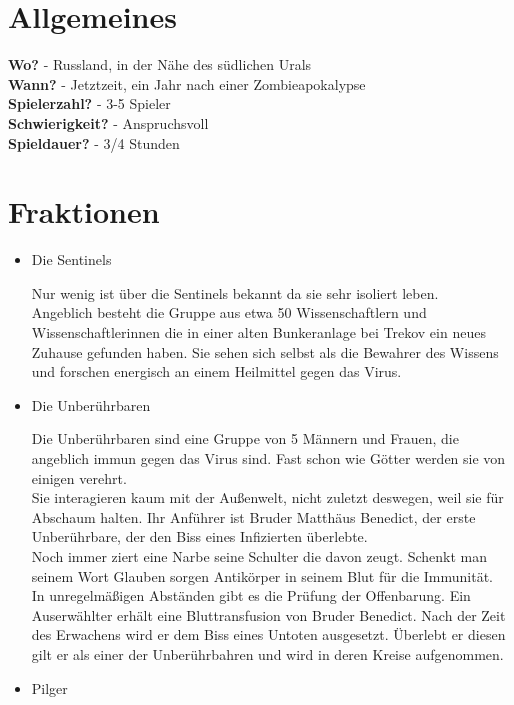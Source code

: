 
\section{Allgemeines}
\textbf{Wo?}            - Russland, in der Nähe des südlichen Urals \\
\textbf{Wann?}          - Jetztzeit, ein Jahr nach einer Zombieapokalypse \\
\textbf{Spielerzahl?}   - 3-5 Spieler \\
\textbf{Schwierigkeit?} - Anspruchsvoll \\
\textbf{Spieldauer?}    - 3/4 Stunden

\section{Fraktionen}
\begin{itemize}
  \item Die Sentinels

Nur wenig ist über die Sentinels bekannt da sie sehr isoliert leben.\\Angeblich besteht die Gruppe aus etwa 50 Wissenschaftlern und Wissenschaftlerinnen die in einer alten Bunkeranlage bei Trekov ein neues Zuhause gefunden haben. Sie sehen sich selbst als die Bewahrer des Wissens und forschen energisch an einem Heilmittel gegen das Virus.

  \item Die Unberührbaren

Die Unberührbaren sind eine Gruppe von 5 Männern und Frauen, die angeblich immun gegen das Virus sind. Fast schon wie Götter werden sie von einigen verehrt.
\\Sie interagieren kaum mit der Außenwelt, nicht zuletzt deswegen, weil sie  für Abschaum halten. Ihr Anführer ist Bruder Matthäus Benedict, der erste Unberührbare, der den Biss eines Infizierten überlebte.
\\Noch immer ziert eine Narbe seine Schulter die davon zeugt. Schenkt man seinem Wort Glauben sorgen Antikörper in seinem Blut für die Immunität.
\\In unregelmäßigen Abständen gibt es die Prüfung der Offenbarung. Ein Auserwählter erhält eine Bluttransfusion von Bruder Benedict. Nach der Zeit des Erwachens wird er dem Biss eines Untoten ausgesetzt. Überlebt er diesen gilt er als einer der Unberührbahren und wird in deren Kreise aufgenommen.

  \item Pilger


\end{itemize}
